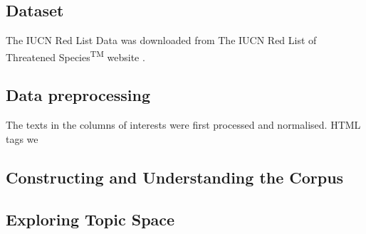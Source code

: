 \subsection{Dataset}

The IUCN Red List Data was downloaded from The IUCN Red List of Threatened Species\textsuperscript{TM} website \parencite{iucn2020}.

\subsection{Data preprocessing}

The texts in the columns of interests were first processed and normalised. HTML tags we

\subsection{Constructing and Understanding the Corpus}

\subsection{Exploring Topic Space}


